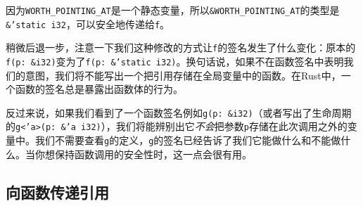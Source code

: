 因为\texttt{WORTH\_POINTING\_AT}是一个静态变量，所以\texttt{\&WORTH\_POINTING\_AT}的类型是\texttt{\&'static i32}，可以安全地传递给\texttt{f}。

稍微后退一步，注意一下我们这种修改的方式让\texttt{f}的签名发生了什么变化：原本的\texttt{f(p: \&i32)}变为了\texttt{f(p: \&'static i32)}。换句话说，如果不在函数签名中表明我们的意图，我们将不能写出一个把引用存储在全局变量中的函数。在Rust中，一个函数的签名总是暴露出函数体的行为。

反过来说，如果我们看到了一个函数签名例如\texttt{g(p: \&i32)}（或者写出了生命周期的\texttt{g<'a>(p: &'a i32)}），我们将能辨别出它\emph{不会}把参数\texttt{p}存储在此次调用之外的变量中。我们不需要查看\texttt{g}的定义，\texttt{g}的签名已经告诉了我们它能做什么和不能做什么。当你想保持函数调用的安全性时，这一点会很有用。

\subsection{向函数传递引用}
































